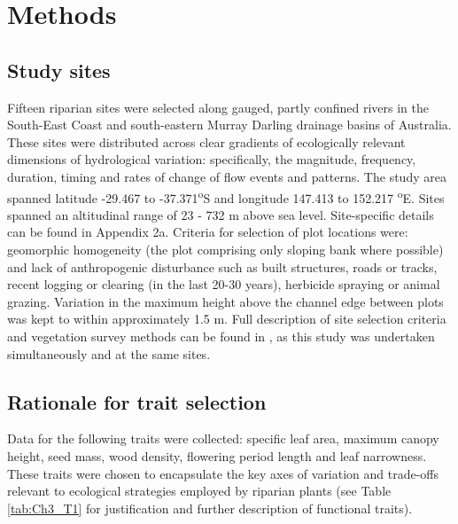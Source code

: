 \documentclass[12pt,a4paper]{memoir}
\begin{document}
\section{Methods}
\subsection{Study sites}
Fifteen riparian sites were selected along gauged, partly confined rivers in the South-East Coast and south-eastern Murray Darling drainage basins of Australia. These sites were distributed across clear gradients of ecologically relevant dimensions of hydrological variation: specifically, the magnitude, frequency, duration, timing and rates of change of flow events and patterns. The study area spanned latitude -29.467 to -37.371\textsuperscript {o}S and longitude 147.413 to 152.217 \textsuperscript{o}E. Sites spanned an altitudinal range of 23 - 732 m above sea level. Site-specific details can be found in Appendix 2a. Criteria for selection of plot locations were: geomorphic homogeneity (the plot comprising only sloping bank where possible) and lack of anthropogenic disturbance such as built structures, roads or tracks, recent logging or clearing (in the last 20-30 years), herbicide spraying or animal grazing. Variation in the maximum height above the channel edge between plots was kept to within approximately 1.5 m. Full description of site selection criteria and vegetation survey methods can be found in \citep{Lawson2015}, as this study was undertaken simultaneously and at the same sites. 

\subsection{Rationale for trait selection}
Data for the following traits were collected: specific leaf area, maximum canopy height, seed mass, wood density, flowering period length and leaf narrowness. These traits were chosen to encapsulate the key axes of variation and trade-offs relevant to ecological strategies employed by riparian plants (see Table \ref{tab:Ch3_T1} for justification and further description of functional traits).
\end{document}

